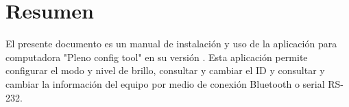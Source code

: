 \chapter{Resumen}
El presente documento es un manual de instalación y uso de la aplicación para computadora "Pleno config tool" en su versión \version . Esta aplicación permite configurar el modo y nivel de brillo, consultar y cambiar el ID y consultar y cambiar la información del equipo por medio de conexión Bluetooth o serial RS-232.